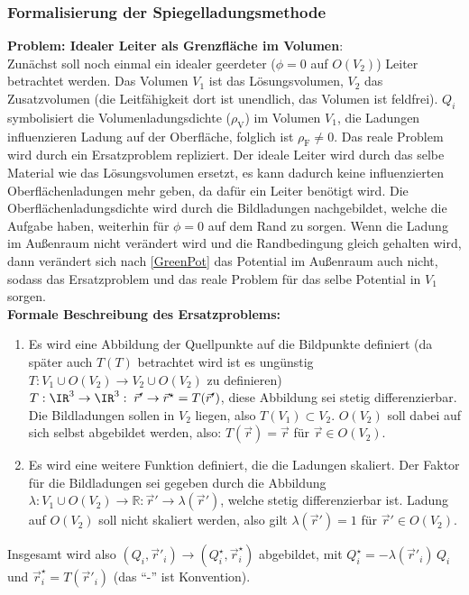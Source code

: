   \subsubsection{Formalisierung der Spiegelladungsmethode}
	  \textbf{Problem: Idealer Leiter als Grenzfläche im Volumen}:\\
	 Zunächst soll noch einmal ein idealer geerdeter ($\phi=0$ auf $O(V_2)$) Leiter betrachtet werden. Das Volumen $V_1$ ist das Lösungsvolumen, $V_2$ das Zusatzvolumen (die Leitfähigkeit dort ist unendlich, das Volumen ist feldfrei). $Q_i$ symbolisiert die Volumenladungsdichte ($\rho_{\text{V}}$) im Volumen $V_1$, die Ladungen influenzieren Ladung auf der Oberfläche, folglich ist $\rho_\text{F}\neq0$. Das reale Problem wird durch ein Ersatzproblem repliziert. Der ideale Leiter wird durch das selbe Material wie das Lösungsvolumen ersetzt, es kann dadurch keine influenzierten Oberflächenladungen mehr geben, da dafür ein Leiter benötigt wird. Die Oberflächenladungsdichte wird durch die Bildladungen nachgebildet, welche die Aufgabe haben, weiterhin für $\phi=0$ auf dem Rand zu sorgen. Wenn die Ladung im Außenraum nicht verändert wird und die Randbedingung gleich gehalten wird, dann verändert sich nach \ref{GreenPot} das Potential im Außenraum auch nicht, sodass das Ersatzproblem und das reale Problem für das selbe Potential in $V_1$ sorgen.\\
		  
		  \textbf{Formale Beschreibung des Ersatzproblems:}
		  \begin{enumerate}
			  \item Es wird eine Abbildung der Quellpunkte auf die Bildpunkte definiert (da später auch $T(T)$ betrachtet wird ist es ungünstig $T: V_1 \cup O(V_2)  \to V_2 \cup O(V_2)$ zu definieren) $T: \IR^3\to\IR^3:\; \vec{r}'  \to \vec{r} ^\star = T( \vec{r}' )$, diese Abbildung sei stetig differenzierbar.
			        Die Bildladungen sollen in $V_2$ liegen, also $T( V_1) \subset V_2$.
			        $O(V_2)$ soll dabei auf sich selbst abgebildet werden, also: $T(\vec{r}  )= \vec{r} $ für $\vec{r}  \in O(V_2)$.
			  \item Es wird eine weitere Funktion definiert, die die Ladungen skaliert. Der Faktor für die Bildladungen sei gegeben durch die Abbildung $\lambda: V_1 \cup O(V_2) \to \mathbb{R}: \vec{r}'  \to \lambda(\vec{r}' )$, welche stetig differenzierbar ist. Ladung auf $O(V_2)$ soll nicht skaliert werden, also gilt $\lambda(\vec{r}' ) = 1$ für $\vec{r}'  \in O(V_2)$.
		  \end{enumerate}
		  Insgesamt wird also $(Q_i, \vec{r}' _i) \to (Q_i^\star, \vec{r} _i^\star) $ abgebildet, mit $Q_i^\star = -\lambda(\vec{r}' _i)\, Q_i$ und $\vec{r} _i^\star = T(\vec{r}' _i)$ (das \enquote{-} ist Konvention).\\
